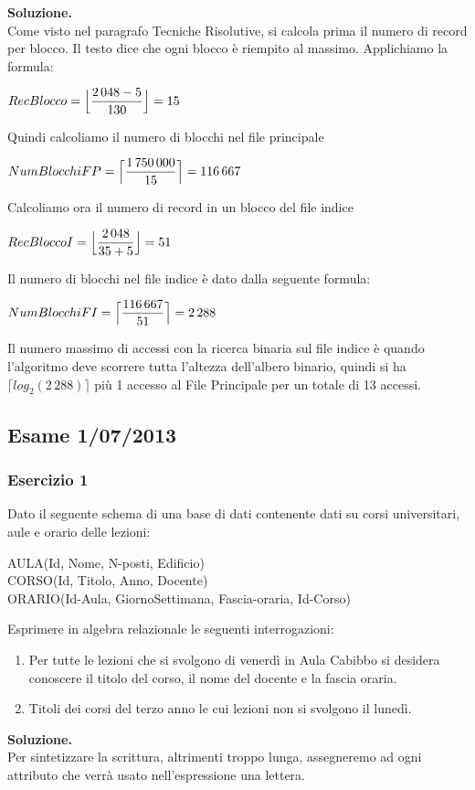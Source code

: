 \noindent\textbf{\fontsize{14pt}{1em}Soluzione.}\\
Come visto nel paragrafo Tecniche Risolutive, si calcola prima il numero di record per blocco. Il testo dice che 
ogni blocco è riempito al massimo. Applichiamo la formula:
\begin{center}
 $RecBlocco = \Bigl\lfloor \dfrac{2\,048-5}{130} \Bigr\rfloor = 15$\\
\end{center}
Quindi calcoliamo il numero di blocchi nel file principale
\begin{center}
 $NumBlocchiFP = \Bigl\lceil \dfrac{1\,750\,000}{15} \Bigr\rceil = 116\,667$\\
\end{center}
Calcoliamo ora il numero di record in un blocco del file indice
\begin{center}
 $RecBloccoI = \Bigl\lfloor \dfrac{2\,048}{35+5} \Bigr\rfloor = 51$\\
\end{center}
Il numero di blocchi nel file indice è dato dalla seguente formula:
\begin{center}
  $NumBlocchiFI= \Bigl\lceil \dfrac{116\,667}{51} \Bigr\rceil = 2\,288$\\
\end{center}
Il numero massimo di accessi con la ricerca binaria sul file indice è quando l'algoritmo deve scorrere tutta l'altezza
dell'albero binario, quindi si ha $\lceil log_2(2\,288)\rceil$ più 1 accesso al File Principale per un totale di 13 accessi.

\newpage
\subsection{Esame 1/07/2013}
  \subsubsection{Esercizio 1}
  Dato il seguente schema di una base di dati contenente dati su corsi universitari, aule e orario delle lezioni:
  \begin{center}
  AULA(Id, Nome, N-posti, Edificio)\\
  CORSO(Id, Titolo, Anno, Docente)\\ 
  ORARIO(Id-Aula, GiornoSettimana, Fascia-oraria, Id-Corso)\\
  \end{center}

  Esprimere in algebra relazionale le seguenti interrogazioni:
  \begin{enumerate}
   \item Per tutte le lezioni che si svolgono di venerdì in Aula Cabibbo si desidera conoscere il titolo del corso,
   il nome del docente e la fascia oraria.
   \item Titoli dei  corsi del terzo anno le cui lezioni non si svolgono il lunedì. 
  \end{enumerate}
  \noindent\textbf{\fontsize{14pt}{1em}Soluzione.}\\
  Per sintetizzare la scrittura, altrimenti troppo lunga, assegneremo ad ogni attributo che verrà usato
  nell'espressione una lettera.
  
